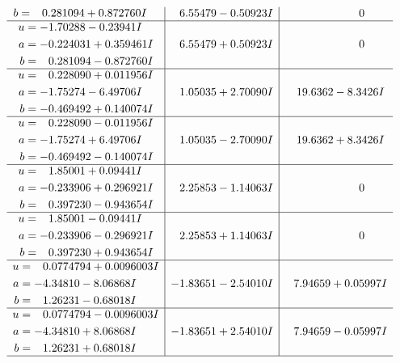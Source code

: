 \documentclass[1p]{elsarticle_modified}
\theoremstyle{definition}
\begin{document}
$$\begin{array}{c|c|c}
\begin{aligned}
b &= \phantom{-}0.281094 + 0.872760 I\end{aligned}
 & \phantom{-}6.55479 - 0.50923 I & \phantom{-0.000000 } 0 \\ \hline\begin{aligned}
u &= -1.70288 - 0.23941 I \\
a &= -0.224031 + 0.359461 I \\
b &= \phantom{-}0.281094 - 0.872760 I\end{aligned}
 & \phantom{-}6.55479 + 0.50923 I & \phantom{-0.000000 } 0 \\ \hline\begin{aligned}
u &= \phantom{-}0.228090 + 0.011956 I \\
a &= -1.75274 - 6.49706 I \\
b &= -0.469492 + 0.140074 I\end{aligned}
 & \phantom{-}1.05035 + 2.70090 I & \phantom{-}19.6362 - 8.3426 I \\ \hline\begin{aligned}
u &= \phantom{-}0.228090 - 0.011956 I \\
a &= -1.75274 + 6.49706 I \\
b &= -0.469492 - 0.140074 I\end{aligned}
 & \phantom{-}1.05035 - 2.70090 I & \phantom{-}19.6362 + 8.3426 I \\ \hline\begin{aligned}
u &= \phantom{-}1.85001 + 0.09441 I \\
a &= -0.233906 + 0.296921 I \\
b &= \phantom{-}0.397230 - 0.943654 I\end{aligned}
 & \phantom{-}2.25853 - 1.14063 I & \phantom{-0.000000 } 0 \\ \hline\begin{aligned}
u &= \phantom{-}1.85001 - 0.09441 I \\
a &= -0.233906 - 0.296921 I \\
b &= \phantom{-}0.397230 + 0.943654 I\end{aligned}
 & \phantom{-}2.25853 + 1.14063 I & \phantom{-0.000000 } 0 \\ \hline\begin{aligned}
u &= \phantom{-}0.0774794 + 0.0096003 I \\
a &= -4.34810 - 8.06868 I \\
b &= \phantom{-}1.26231 - 0.68018 I\end{aligned}
 & -1.83651 - 2.54010 I & \phantom{-}7.94659 + 0.05997 I \\ \hline\begin{aligned}
u &= \phantom{-}0.0774794 - 0.0096003 I \\
a &= -4.34810 + 8.06868 I \\
b &= \phantom{-}1.26231 + 0.68018 I\end{aligned}
 & -1.83651 + 2.54010 I & \phantom{-}7.94659 - 0.05997 I\\
 \hline 
 \end{array}$$\newpage\newpage\renewcommand{\arraystretch}{1}
\end{document}
